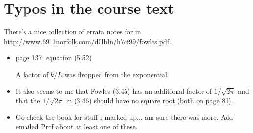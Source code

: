 \chapter{Typos in the course text}

There's a nice collection of errata notes for \citep{fowles1989introduction} in \href{http://www.6911norfolk.com/d0lbln/h7cf99/fowles.pdf}{http://www.6911norfolk.com/d0lbln/h7cf99/fowles.pdf}.

\begin{itemize}
\item page 137: equation (5.52)

A factor of $k/L$ was dropped from the exponential.

\item It also seems to me that Fowles (3.45) has an additional factor of $1/\sqrt{2 \pi}$ and that the $1/\sqrt{2\pi}$ in (3.46) should have no
square root (both on page 81).

\item Go check the book for stuff I marked up... am sure there was more.  Add emailed Prof about at least one of these.

\end{itemize}
